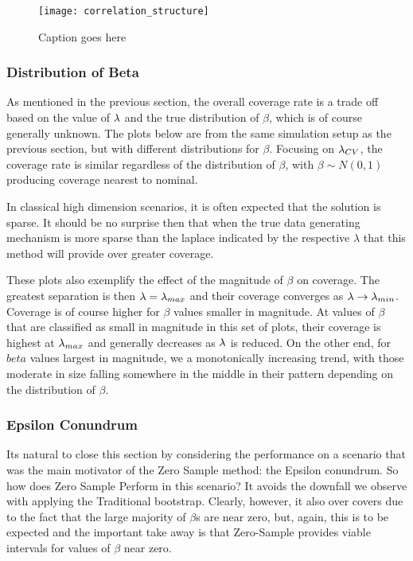 \begin{figure}
  \texttt{[image: correlation\_structure]}
  \caption{\label{Fig:correlation_structure} Caption goes here}
\end{figure}


\subsubsection{Distribution of Beta}

As mentioned in the previous section, the overall coverage rate is a trade off based on the value of $\lambda$ and the true distribution of $\beta$, which is of course generally unknown. The plots below are from the same simulation setup as the previous section, but with different distributions for $\beta$. Focusing on $\lambda_{CV}$, the coverage rate is similar regardless of the distribution of $\beta$, with $\beta \sim N(0, 1)$ producing coverage nearest to nominal.

In classical high dimension scenarios, it is often expected that the solution is sparse. It should be no surprise then that when the true data generating mechanism is more sparse than the laplace indicated by the respective $\lambda$ that this method will provide over greater coverage.

These plots also exemplify the effect of the magnitude of $\beta$ on coverage. The greatest separation is then $\lambda = \lambda_{max}$ and their coverage converges as $\lambda \rightarrow \lambda_{min}$. Coverage is of course higher for $\beta$ values smaller in magnitude. At values of $\beta$ that are classified as small in magnitude in this set of plots, their coverage is highest at $\lambda_{max}$ and generally decreases as $\lambda$ is reduced. On the other end, for $beta$ values largest in magnitude, we a monotonically increasing trend, with those moderate in size falling somewhere in the middle in their pattern depending on the distribution of $\beta$.

\subsubsection{Epsilon Conundrum}\label{Sec:Epsilon}

Its natural to close this section by considering the performance on a scenario that was the main motivator of the Zero Sample method: the Epsilon conundrum. So how does Zero Sample Perform in this scenario? It avoids the downfall we observe with applying the Traditional bootstrap. Clearly, however, it also over covers due to the fact that the large majority of $\beta$s are near zero, but, again, this is to be expected and the important take away is that Zero-Sample provides viable intervals for values of $\beta$ near zero.

